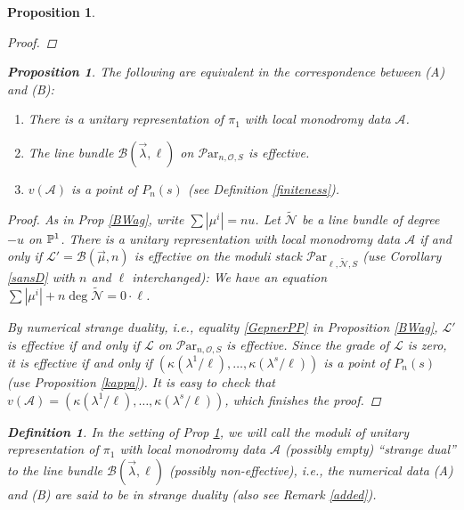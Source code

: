\documentclass[11pt]{amsart}
\newcommand\ml{\mathcal{L}}
\newcommand\ma{\mathcal{A}}
\newcommand\mn{\mathcal{N}}
\newcommand\Par{\mathcal{P}\text{ar} }
\newtheorem{proposition}[theorem]{Proposition}
\newtheorem{defi}[theorem]{Definition}
\numberwithin{theorem}{subsection}
\begin{document}
{\begin{proposition}
\begin{proof}
\end{proof}

\begin{proposition}\label{schubertt}
The following are equivalent in the correspondence  between (A) and (B):
\begin{enumerate}
\item There is a unitary representation of $\pi_1$ with  local monodromy data $\mathcal{A}$.
\item The line bundle $\mathcal{B}(\vec{\lambda},\ell)$ on $\Par_{n,{\mathcal{O}},S}$ is effective.
\item $v(\ma)$ is a point of $P_n(s)$ (see Definition \ref{finiteness}).
\end{enumerate}

\end{proposition}
\begin{proof}
As in Prop \ref{BWag}, write $\sum|\mu^i|=nu$. Let $\widetilde{\mathcal{N}}$ be a line bundle of degree $-u$ on $\Bbb{P}^1$.
There is a unitary representation with  local monodromy data $\mathcal{A}$ if and only if $\ml'=\mathcal{B}(\vec{\mu},n)$ is effective on the moduli stack  $\Par_{\ell,\widetilde{\mathcal{N}},S}$ (use Corollary \ref{sansD} with $n$ and $\ell$ interchanged): We have an equation
$\sum|\mu^i| +n\deg \widetilde{\mathcal{N}} =0\cdot\ell$.

By numerical strange duality, i.e., equality \eqref{GepnerPP} in Proposition \ref{BWag},  $\ml'$ is effective if and only if $\ml$ on  $\Par_{n,{\mathcal{O}},S}$ is effective. Since the grade of $\ml$ is zero, it is effective if and only if $(\kappa(\lambda^1/\ell),\dots,\kappa(\lambda^s/\ell))$ is a point of $P_n(s)$ (use Proposition \ref{kappa}).
It is easy to check that $v(\ma)=(\kappa(\lambda^1/\ell),\dots,\kappa(\lambda^s/\ell))$, which finishes the proof.
\end{proof}

\begin{defi}\label{Shosta}
In the setting of Prop \ref{schubertt}, we will call the moduli of unitary representation of $\pi_1$ with local monodromy data $\mathcal{A}$ (possibly empty)  ``strange dual'' to  the line bundle  $\mathcal{B}(\vec{\lambda},\ell)$ (possibly non-effective), i.e., the numerical data (A) and (B) are said to be in strange duality (also see Remark \ref{added}).


\end{defi}
\end{proposition}}
\end{document}
